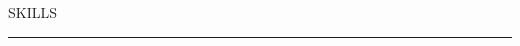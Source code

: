 

\hfill\begin{minipage}{\dimexpr\textwidth-2ex}

\vspace{2ex}
{\noindent\color{cblue} SKILLS }

\vspace{-1.5ex}
{\hspace{0ex}\noindent\color{dblue}\rule{6.935in}{0.4pt}} %
\vspace{-2.4ex}




\end{minipage}
